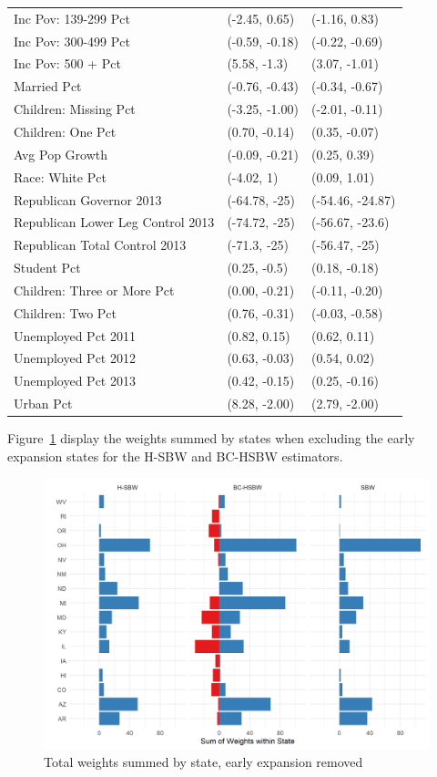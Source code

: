 \begin{table}[h!]
\begin{tabular}{lll}
  Inc Pov: 139-299 Pct & (-2.45, 0.65) & (-1.16, 0.83) \\ 
  Inc Pov: 300-499 Pct & (-0.59, -0.18) & (-0.22, -0.69) \\ 
  Inc Pov: 500 + Pct & (5.58, -1.3) & (3.07, -1.01) \\ 
  Married Pct & (-0.76, -0.43) & (-0.34, -0.67) \\ 
  Children: Missing Pct & (-3.25, -1.00) & (-2.01, -0.11) \\ 
  Children: One Pct & (0.70, -0.14) & (0.35, -0.07) \\ 
  Avg Pop Growth & (-0.09, -0.21) & (0.25, 0.39) \\ 
  Race: White Pct & (-4.02, 1) & (0.09, 1.01) \\ 
  Republican Governor 2013 & (-64.78, -25) & (-54.46, -24.87) \\ 
  Republican Lower Leg Control 2013 & (-74.72, -25) & (-56.67, -23.6) \\ 
  Republican Total Control 2013 & (-71.3, -25) & (-56.47, -25) \\ 
  Student Pct & (0.25, -0.5) & (0.18, -0.18) \\ 
  Children: Three or More Pct & (0.00, -0.21) & (-0.11, -0.20) \\ 
  Children: Two Pct & (0.76, -0.31) & (-0.03, -0.58) \\ 
  Unemployed Pct 2011 & (0.82, 0.15) & (0.62, 0.11) \\ 
  Unemployed Pct 2012 & (0.63, -0.03) & (0.54, 0.02) \\ 
  Unemployed Pct 2013 & (0.42, -0.15) & (0.25, -0.16) \\ 
  Urban Pct & (8.28, -2.00) & (2.79, -2.00) \\ 
   \hline
\end{tabular}
\end{table}

Figure~\ref{fig:weightsbystatec2} display the weights summed by states when excluding the early expansion states for the H-SBW and BC-HSBW estimators.

\begin{figure}[H]
\begin{center}
    \caption{Total weights summed by state, early expansion removed}
    \label{fig:weightsbystatec2}
    \includegraphics[scale=0.5]{01_Plots/weights-by-state-sbw-hsbw-c2-color.png}
\end{center}
\end{figure}

\clearpage